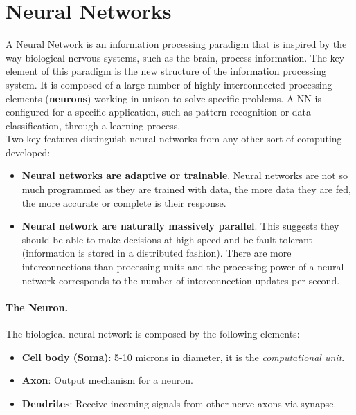 \section{Neural Networks}
A Neural Network is an information processing paradigm that is inspired by the way biological nervous systems, such as the brain, process information. The key element of this paradigm is the new structure of the information processing system. It is composed of a large number of highly interconnected processing elements (\textbf{neurons}) working in unison to solve specific problems. A NN is configured for a specific application, such as pattern recognition or data classification, through a learning process.\\
Two key features distinguish neural networks from any other sort of computing developed:
\begin{itemize}
	\item \textbf{Neural networks are adaptive or trainable}. Neural networks are not so much programmed as they are trained with data, the more data they are fed, the more accurate or complete is their response.
	\item \textbf{Neural network are naturally massively parallel}. This suggests they should be able to make decisions at high-speed and be fault tolerant (information is stored in a distributed fashion). There are more interconnections than processing units and the processing power of a neural network corresponds to the number of interconnection updates per second. 
\end{itemize}

\paragraph*{The Neuron.} The biological neural network is composed by the following elements:
\begin{itemize}
	\item \textbf{Cell body (Soma)}: 5-10 microns in diameter, it is the \textit{computational unit}.
	\item \textbf{Axon}: Output mechanism for a neuron.
	\item \textbf{Dendrites}: Receive incoming signals from other nerve axons via synapse.
\end{itemize}

